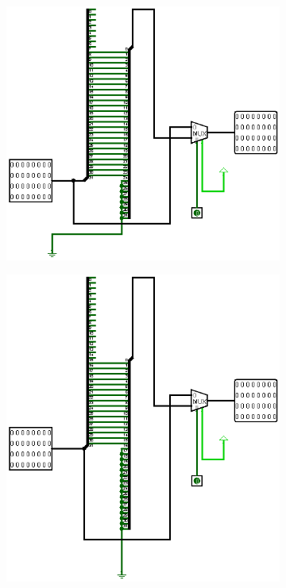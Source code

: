 \documentclass[a4paper,12pt]{article}
\begin{document}
\begin{figure}[H]
    \begin{subfigure}[b]{0.3\textwidth}
        \centering
        \includegraphics[width=\linewidth]{8 bit rightShifter.png}
    \end{subfigure}
    \hfill
    \begin{subfigure}[b]{0.3\textwidth}
        \centering
        \includegraphics[width=\linewidth]{16 bit rightShifter.png}

\end{subfigure}
\end{figure}
\end{document}
